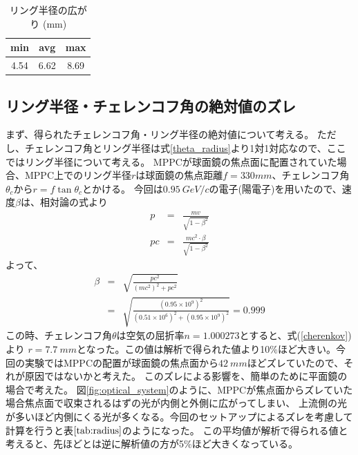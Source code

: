 \documentclass[uplatex, titlepage, dvipdfmx, 12pt, a4paper]{jsreport}
\begin{document}
    \begin{table}[b]
      \begin{center}
        \label{tab:radius}
        \caption{リング半径の広がり (mm)}
        \begin{tabular}{|c|c|c|}\hline
          min & avg & max\\ \hline
          4.54 & 6.62 & 8.69\\ \hline
        \end{tabular}
      \end{center}
    \end{table}
    \subsection{リング半径・チェレンコフ角の絶対値のズレ}
      まず、得られたチェレンコフ角・リング半径の絶対値について考える。
      ただし、チェレンコフ角とリング半径は式\ref{theta_radius}より1対1対応なので、ここではリング半径について考える。
      MPPCが球面鏡の焦点面に配置されていた場合、MPPC上でのリング半径$r$は球面鏡の焦点距離$f=330 mm$、チェレンコフ角$\theta_{c}$から$r=f\tan{\theta_{c}}$とかける。
      今回は$\SI{0.95}{GeV/c}$の電子(陽電子)を用いたので、速度$\beta$は、相対論の式より
      \begin{eqnarray}
        p &=& \frac{mv}{\sqrt{1-{\beta}^2}} \nonumber \\
        pc &=& \frac{mc^2\cdot \beta}{\sqrt{1-{\beta}^2}} \nonumber 
      \end{eqnarray}
      よって、
      \begin{eqnarray}
        \beta &=& \sqrt{\frac{{pc}^2}{\left(mc^2\right)^2 + {pc}^2}} \nonumber \\
        &=& \sqrt{\frac{\left(0.95\times 10^9\right)^2}{\left(0.51\times 10^6\right)^2 + \left(0.95\times 10^9\right)^2}} = 0.999 \nonumber
      \end{eqnarray}
      この時、チェレンコフ角$\theta$は空気の屈折率$n=1.000273$とすると、式(\ref{cherenkov})より
      $r=\SI{7.7}{mm}$となった。この値は解析で得られた値より10\%ほど大きい。今回の実験ではMPPCの配置が球面鏡の焦点面から$\SI{42}{mm}$ほどズレていたので、それが原因ではないかと考えた。
      このズレによる影響を、簡単のために平面鏡の場合で考えた。
      図\ref{fig:optical_system}のように、MPPCが焦点面からズレていた場合焦点面で収束されるはずの光が内側と外側に広がってしまい、
      上流側の光が多いほど内側にくる光が多くなる。今回のセットアップによるズレを考慮して計算を行うと表$\ref{tab:radius}$のようになった。
      この平均値が解析で得られる値と考えると、先ほどとは逆に解析値の方が5\%ほど大きくなっている。
\end{document}
